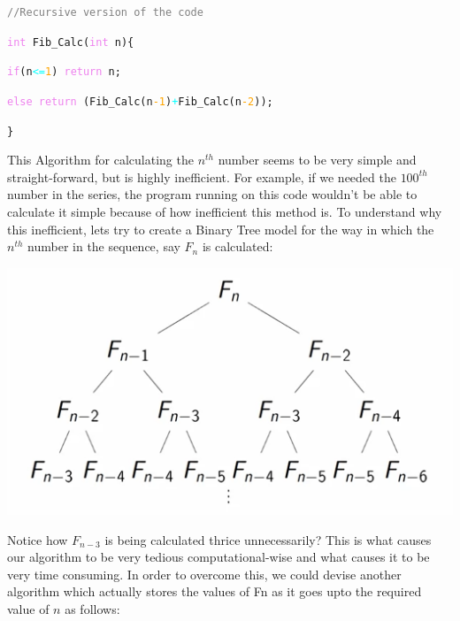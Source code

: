 \documentclass{article}
\theoremstyle{definition}
\theoremstyle{example}
\begin{document}
\vspace{5mm}
\noindent \hspace{10mm} \texttt{\textcolor{gray}{//Recursive version of the code}}\par
\noindent \hspace{10mm} \texttt{\textcolor{violet}{int} Fib\_Calc(\textcolor{violet}{int} n)\{} \par
\noindent \hspace{20mm} \texttt{\textcolor{violet}{if}(n\textcolor{cyan}{<=}\textcolor{orange}{1}) \textcolor{violet}{return} n;}\par
\noindent \hspace{20mm} \texttt{\textcolor{violet}{else return} (Fib\_Calc(n\textcolor{orange}{-1})\textcolor{cyan}{+}Fib\_Calc(n\textcolor{orange}{-2}));}\par
\noindent \hspace{10mm} \texttt{\}}
\vspace{5mm}

 This Algorithm for calculating the $n^{th}$ number seems to be very simple and straight-forward, but is highly inefficient. For example, if we needed the $100^{th}$ number in the series, the program running on this code wouldn't be able to calculate it simple because of how inefficient this method is.
To understand why this inefficient, lets try to create a Binary Tree model for the way in which the $n^{th}$ number in the sequence, say $F_n$ is calculated: \newline

 \includegraphics[scale = 0.5]{Bin.png}\par

 Notice how $F_{n-3}$ is being calculated thrice unnecessarily? This is what causes our algorithm to be very tedious computational-wise and what causes it to be very time consuming. In order to overcome this, we could devise another algorithm which actually stores the values of Fn as it goes upto the required value of $n$ as follows:\par
\end{document}
